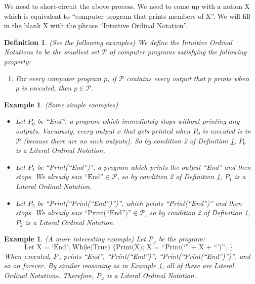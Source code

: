\documentclass[runningheads]{llncs}
\newtheorem{myexample}[mytheorem]{Example}
\newtheorem{mydefinition}[mytheorem]{Definition}
\begin{document}
We need to short-circuit the above process. We need to come up with a notion
X which is equivalent to ``computer program that prints members of X''.
We will fill in the blank X with the phrase ``Intuitive Ordinal Notation''.

\begin{mydefinition}
\label{literalnotationdef}
    (See the following examples)
    We define the Intuitive Ordinal Notations to be the smallest set $\mathcal P$
    of computer programs satisfying the following property:
    \begin{enumerate}
        \item
            For every computer program $p$,
            if $\mathcal P$ contains every output that $p$ prints when $p$ is executed,
            then $p\in\mathcal P$.
    \end{enumerate}
\end{mydefinition}

\begin{myexample}
\label{simpleexamples}
(Some simple examples)
    \begin{itemize}
    \item
    Let $P_0$ be ``End'', a program which immediately stops without printing any outputs.
    Vacuously, every output $x$ that gets printed when $P_0$ is executed is in $\mathcal P$
    (because there are no such outputs). So by condition 2 of
    Definition \ref{literalnotationdef}, $P_0$ is a Literal Ordinal Notation.
    \item
    Let $P_1$ be ``Print(``End'')'', a program which prints the output ``End'' and then
    stops. We already saw $\mbox{``End''}\in\mathcal P$, so by condition 2 of
    Definition \ref{literalnotationdef}, $P_1$ is a Literal Ordinal Notation.
    \item
    Let $P_2$ be ``Print(``Print(``End'')'')'', which prints ``Print(``End'')'' and then
    stops. We already saw $\mbox{``Print(``End'')''}\in\mathcal P$, so by condition 2
    of Definition \ref{literalnotationdef}, $P_2$ is a Literal Ordinal Notation.
    \end{itemize}
\end{myexample}

\begin{myexample}
\label{omegaexample}
(A more interesting example)
    Let $P_\omega$ be the program:
    \[
        \mbox{Let X = `End'; While(True) \{ Print(X); X = ``Print(`'' + X + ``')''; \}}
    \]
    When executed, $P_\omega$ prints ``End'', ``Print(``End'')'',
    ``Print(``Print(``End'')'')'', and so on forever. By similar reasoning as
    in Example \ref{simpleexamples}, all of these are Literal Ordinal Notations.
    Therefore, $P_\omega$ is a Literal Ordinal Notation.
\end{myexample}
\end{document}
